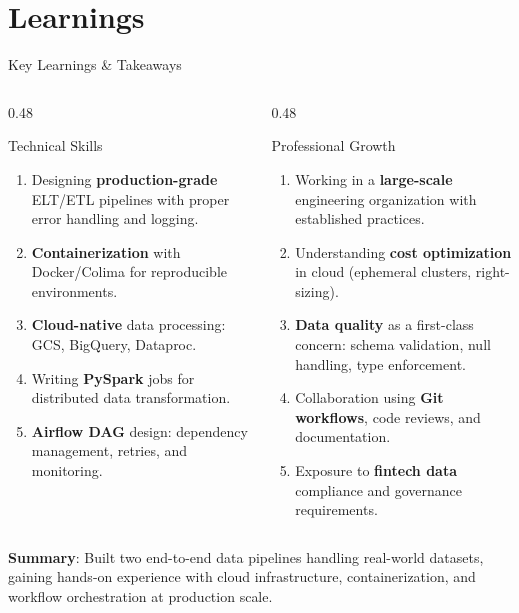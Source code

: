 \documentclass{beamer}
\begin{document}
\section{Learnings}
\begin{frame}[shrink=10]{Key Learnings \& Takeaways}
  \begin{columns}[T]
    \begin{column}{0.48\textwidth}
      \begin{block}{\faGraduationCap\quad Technical Skills}
        \begin{enumerate}
          \item Designing \textbf{production-grade} ELT/ETL pipelines with proper error handling and logging.
          \item \textbf{Containerization} with Docker/Colima for reproducible environments.
          \item \textbf{Cloud-native} data processing: GCS, BigQuery, Dataproc.
          \item Writing \textbf{PySpark} jobs for distributed data transformation.
          \item \textbf{Airflow DAG} design: dependency management, retries, and monitoring.
        \end{enumerate}
      \end{block}
    \end{column}
    \begin{column}{0.48\textwidth}
      \begin{exampleblock}{\faBriefcase\quad Professional Growth}
        \begin{enumerate}
          \item Working in a \textbf{large-scale} engineering organization with established practices.
          \item Understanding \textbf{cost optimization} in cloud (ephemeral clusters, right-sizing).
          \item \textbf{Data quality} as a first-class concern: schema validation, null handling, type enforcement.
          \item Collaboration using \textbf{Git workflows}, code reviews, and documentation.
          \item Exposure to \textbf{fintech data} compliance and governance requirements.
        \end{enumerate}
      \end{exampleblock}
    \end{column}
  \end{columns}
  \vspace{0.15cm}
  \begin{center}
    \colorbox{RakutenCrimson!10}{\parbox{0.9\textwidth}{\centering
      \textcolor{RakutenCrimson}{\textbf{\faStar\quad Summary}}: Built two end-to-end data pipelines handling real-world datasets, gaining hands-on experience with cloud infrastructure, containerization, and workflow orchestration at production scale.
    }}
  \end{center}
\end{frame}
\end{document}
